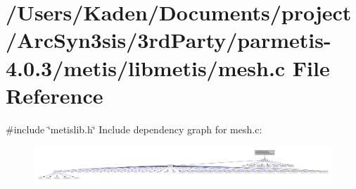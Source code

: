 \hypertarget{a00927}{}\section{/\+Users/\+Kaden/\+Documents/project/\+Arc\+Syn3sis/3rd\+Party/parmetis-\/4.0.3/metis/libmetis/mesh.c File Reference}
\label{a00927}
{\ttfamily \#include \char`\"{}metislib.\+h\char`\"{}}\newline
Include dependency graph for mesh.\+c\+:\nopagebreak
\begin{figure}[H]
\begin{center}
\leavevmode
\includegraphics[width=350pt]{a00928}
\end{center}
\end{figure}
